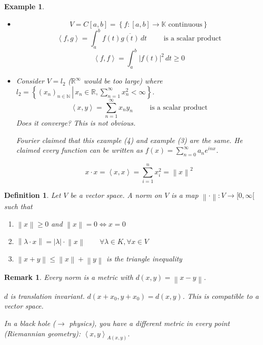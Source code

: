 \documentclass[a4paper]{article}
\newcounter{lecref}[section]
\numberwithin{lecref}{section}
\newtheorem{example}[lecref]{Example}
\newtheorem{definition}[lecref]{Definition}
\newtheorem*{Remark}{Remark}
\newcommand{\set}[1]{\left\{#1\right\}}
\newcommand{\setdef}[2]{\left\{\left.#1\,\right|\,#2\right\}}
\newcommand{\angel}[1]{\left\langle#1\right\rangle}
\newcommand{\norm}[1]{\left\|#1\right\|}
\newcommand{\card}[1]{\left|#1\right|}
\begin{document}
\begin{example}
\begin{itemize}
    \item
      \[ V = C[a,b] = \set{f: [a,b] \to \mathbb K \text{ continuous}} \]
      \[ \angel{f,g} = \int_a^b f(t) \overline{g(t)} \, dt \qquad \text{ is a scalar product} \]
      \[ \angel{f,f} = \int_a^b \card{f(t)}^2 \, dt \geq 0 \]

    \item
      Consider $V = l_2$ ($\mathbb R^{\infty}$ would be too large) where $l_2 = \setdef{(x_n)_{n\in\mathbb N}}{x_n \in \mathbb R, \sum_{n=1}^\infty x_n^2 < \infty}$.
      \[ \angel{x, y} = \sum_{n=1}^\infty x_n y_n \qquad \text{ is a scalar product} \]
      Does it converge? This is not obvious.

      Fourier claimed that this example (4) and example (3) are the same.
      He claimed every function can be written as $f(x) = \sum_{n=0}^\infty a_n e^{inx}$.

      \[ x \cdot x = \angel{x, x} = \sum_{i=1}^n x_i^2 = \norm{x}^2 \]
  \end{itemize}
\end{example}

\begin{definition}
  Let $V$ be a vector space.
  A \emph{norm} on $V$ is a map $\norm{\cdot}: V \to [0,\infty[$
  such that
  \begin{enumerate}
    \item $\norm{x} \geq 0$ and $\norm{x} = 0 \iff x = 0$
    \item $\norm{\lambda \cdot x} = \card{\lambda} \cdot \norm{x} \qquad \forall \lambda \in K, \forall x \in V$
    \item $\norm{x + y} \leq \norm{x} + \norm{y}$ is the triangle inequality
  \end{enumerate}
\end{definition}

\begin{Remark}
  Every norm is a metric with $d(x,y) = \norm{x - y}$.

  $d$ is translation invariant. $d(x + x_0, y + x_0) = d(x, y)$.
  This is compatible to a vector space.

  In a black hole ($\to$ physics), you have a different metric in every point (Riemannian geometry): $\angel{x,y}_{A(x,y)}$.
\end{Remark}
\end{document}
